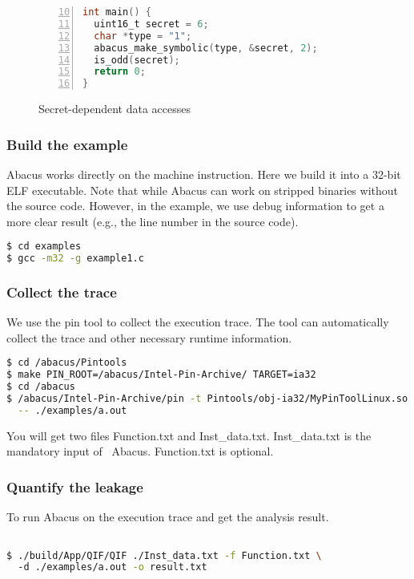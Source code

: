 \documentclass[10pt,conference]{IEEEtran}
\newcommand{\tool}{\textsf{Abacus}}
\begin{document}
\begin{figure}[h]
\begin{lstlisting}[firstnumber=10, xleftmargin=.06\textwidth, xrightmargin=.06\textwidth,numbers=left, frame=single, language=C]
int main() {
  uint16_t secret = 6;
  char *type = "1";
  abacus_make_symbolic(type, &secret, 2); 
  is_odd(secret);
  return 0;
}
\end{lstlisting}
\caption{Secret-dependent data accesses}
\label{fig:example1}
\end{figure}



\subsubsection{Build the example}

Abacus works directly on the machine instruction. Here we build it into 
a 32-bit ELF executable. Note that while Abacus can work on stripped binaries 
without the source code. However, in the example, we use debug information 
to get a more clear result (e.g., the line number in the source code).
\begin{lstlisting}[language=bash]
$ cd examples
$ gcc -m32 -g example1.c
\end{lstlisting}


\subsubsection{Collect the trace}
We use the pin tool to collect the execution trace. The tool can automatically 
collect the trace and other necessary runtime information.
\begin{lstlisting}[language=bash]
$ cd /abacus/Pintools
$ make PIN_ROOT=/abacus/Intel-Pin-Archive/ TARGET=ia32
$ cd /abacus
$ /abacus/Intel-Pin-Archive/pin -t Pintools/obj-ia32/MyPinToolLinux.so \
  -- ./examples/a.out 
\end{lstlisting}

You will get two files \textsf{Function.txt} and \textsf{Inst\_data.txt}. \textsf{Inst\_data.txt} is the mandatory input of ~\tool{}. \textsf{Function.txt}
is optional. 

\subsubsection{Quantify the leakage}
To run Abacus on the execution trace and get the analysis result.
\begin{lstlisting}[language=bash]

$ ./build/App/QIF/QIF ./Inst_data.txt -f Function.txt \ 
  -d ./examples/a.out -o result.txt
\end{lstlisting}
\end{document}
